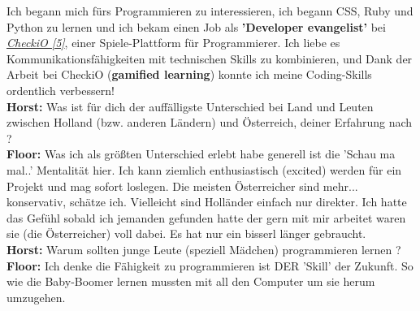 \documentclass[10pt,a4paper,ngerman,twoside]{article} %
\begin{document}
\begin{multicols}{3}
Ich begann mich fürs Programmieren zu interessieren, ich begann CSS, Ruby und Python zu lernen und ich bekam einen Job als \textbf{'Developer evangelist'} bei \href{http://www.checkio.org/}{\textit{CheckiO [5]}}, einer Spiele-Plattform für Programmierer. Ich liebe es Kommunikationsfähigkeiten mit technischen Skills zu kombinieren, und Dank der Arbeit bei CheckiO (\textbf{gamified learning}) konnte ich meine Coding-Skills ordentlich verbessern! \\
\textbf{Horst:} Was ist für dich der auffälligste Unterschied bei Land und Leuten zwischen Holland (bzw. anderen Ländern) und Österreich, deiner Erfahrung nach ? \\
\textbf{Floor:} Was ich als größten Unterschied erlebt habe generell ist die 'Schau ma mal..' Mentalität hier. Ich kann ziemlich enthusiastisch (excited) werden für ein Projekt und mag sofort loslegen. Die meisten Österreicher sind mehr... konservativ, schätze ich. Vielleicht sind Holländer einfach nur direkter. Ich hatte das Gefühl sobald ich jemanden gefunden hatte der gern mit mir arbeitet waren sie (die Österreicher) voll dabei. Es hat nur ein bisserl länger gebraucht. \\
\textbf{Horst:} Warum sollten junge Leute (speziell Mädchen) programmieren lernen ? \\
\textbf{Floor:} Ich denke die Fähigkeit zu programmieren ist DER 'Skill' der Zukunft. So wie die Baby-Boomer lernen mussten mit all den Computer um sie herum umzugehen. 


\end{multicols}
\end{document}
